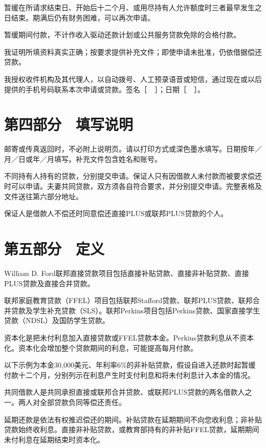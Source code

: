 \documentclass[UTF8,fontset=none,11pt,a4paper]{ctexart}
\begin{document}
暂缓在所请求结束日、开始后十二个月、或用尽持有人允许额度时三者最早发生之日结束。期满后仍有财务困难，可以\allowbreak\mbox{再次申请。}


暂缓期间付款，不计作收入驱动还款计划或公共服务贷款免除的\allowbreak\mbox{合格付款。}


我证明所填资料真实正确；按要求提供补充文件；即使申请未批准，仍依借据\allowbreak\mbox{偿还贷款。}


我授权收件机构及其代理人，以自动拨号、人工预录语音或短信，通过现在或以后提供的手机号码联系本次申请或贷款。签名［　］；日期［　］。


\section*{第四部分　填写说明}
邮寄或传真返回时，不必附上说明页。请以打印方式或深色墨水填写。日期按年／月／日或年／月填写。补充文件包含姓名\allowbreak\mbox{和账号。}


不同持有人持有的贷款，分别提交申请。保证人只有因借款人未付款而被要求偿还时可以申请。夫妻共同贷款，双方须各自符合要求，并分别提交申请。完整表格及文件送往第六\allowbreak\mbox{部分地址。}


保证人是借款人不偿还时同意偿还直接PLUS或联邦PLUS贷\allowbreak\mbox{款的个人。}


\section*{第五部分　定义}
William D. Ford联邦直接贷款项目包括直接补贴贷款、直接非补贴贷款、直接PLUS贷款及直接\allowbreak\mbox{合并贷款。}


联邦家庭教育贷款（FFEL）项目包括联邦Stafford贷款、联邦PLUS贷款、联邦合并贷款及学生补充贷款（SLS）。联邦Perkins项目包括Perkins贷款、国家直接学生贷款（NDSL）及国防\allowbreak\mbox{学生贷款。}


资本化是把未付利息加入直接贷款或FFEL贷款本金。Perkins贷款利息从不资本化。资本化会增加整个贷款期间的利息，可能提高\allowbreak\mbox{每月付款。}


以下示例为本金30,000美元、年利率6\%的非补贴贷款，假设自进入还款时起暂缓付款十二个月，分别列示在利息产生时支付利息和将未付利息计入本\allowbreak\mbox{金的情况。}


共同借款人是共同承担直接或联邦合并贷款、或联邦PLUS贷款的两名借款人之一。两人对全部贷款负同等\allowbreak\mbox{偿还责任。}


延期还款是依法有权推迟偿还的期间。补贴贷款在延期期间不向您收利息；非补贴贷款始终收利息。直接非补贴贷款，或教育部持有的非补贴FFEL贷款，延期期间未付利息在延期结束\allowbreak\mbox{时资本化。}
\end{document}
